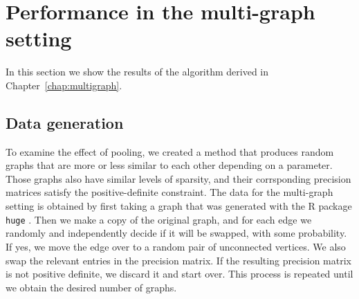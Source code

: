 \documentclass[a4paper, 11pt, oneside]{report}
\newcommand{\1}{\mathds{1}}
\begin{document}
\section{Performance in the multi-graph setting}
In this section we show the results of the algorithm derived in Chapter~\ref{chap:multigraph}.

\subsection{Data generation}\label{ssect:data-generation}
To examine the effect of pooling, we created a method that produces random graphs that are more or less similar to each other depending on a parameter.
Those graphs also have similar levels of sparsity,
and their corrsponding precision matrices satisfy the positive-definite
constraint.
The data for the multi-graph setting is obtained by first taking a graph
that was generated with the R package \texttt{huge} \citep{huge2020}.
Then we make a copy of the original graph,
and for each edge we randomly and independently decide if it will be swapped, with some probability.
If yes, we move the edge over to a random pair of unconnected vertices.
We also swap the relevant entries in the precision matrix.
If the resulting precision matrix is not positive definite, we discard it and start over.
This process is repeated until we obtain the desired number of graphs.
\end{document}
